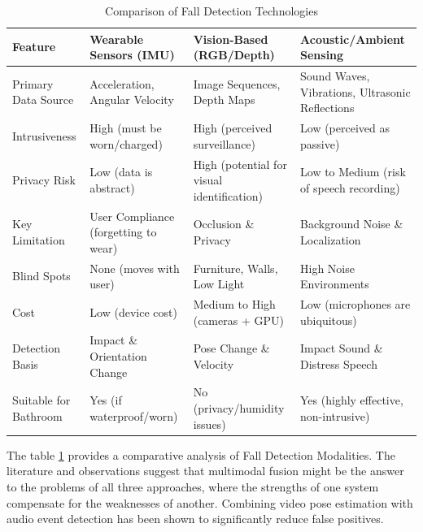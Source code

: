 \documentclass[11pt, a4paper, twoside]{article}
\begin{document}
\begin{table}[htbp]
\centering
\caption{Comparison of Fall Detection Technologies}
\label{tab:fall-detection}
\renewcommand{\arraystretch}{1.5} %
\begin{tabular}{|p{2.5cm}|p{3.5cm}|p{3.5cm}|p{3.5cm}|}
\hline
\textbf{Feature} & \textbf{Wearable Sensors (IMU)} & \textbf{Vision-Based (RGB/Depth)} & \textbf{Acoustic/Ambient Sensing} \\ \hline
Primary Data Source & Acceleration, Angular Velocity & Image Sequences, Depth Maps & Sound Waves, Vibrations, Ultrasonic Reflections \\ \hline
Intrusiveness & High (must be worn/charged) & High (perceived surveillance) & Low (perceived as passive) \\ \hline
Privacy Risk & Low (data is abstract) & High (potential for visual identification) & Low to Medium (risk of speech recording) \\ \hline
Key Limitation & User Compliance (forgetting to wear) & Occlusion \& Privacy & Background Noise \& Localization \\ \hline
Blind Spots & None (moves with user) & Furniture, Walls, Low Light & High Noise Environments \\ \hline
Cost & Low (device cost) & Medium to High (cameras + GPU) & Low (microphones are ubiquitous) \\ \hline
Detection Basis & Impact \& Orientation Change & Pose Change \& Velocity & Impact Sound \& Distress Speech \\ \hline
Suitable for Bathroom & Yes (if waterproof/worn) & No (privacy/humidity issues) & Yes (highly effective, non-intrusive) \\ \hline
\end{tabular}
\end{table}

The table \ref{tab:fall-detection} provides a comparative analysis of Fall Detection Modalities. The literature and observations suggest that multimodal fusion might be the answer to the problems of all three approaches, where the strengths of one system compensate for the weaknesses of another. Combining video pose estimation with audio event detection has been shown to significantly reduce false positives.
\end{document}

